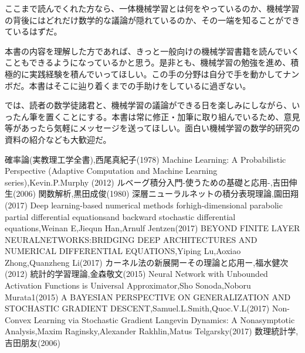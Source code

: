 \documentclass[dvipdfmx, a4paper]{jsarticle}
\begin{document}
ここまで読んでくれた方なら、一体機械学習とは何をやっているのか、機械学習の背後にはどれだけ数学的な議論が隠れているのか、その一端を知ることができているはずだ。

本書の内容を理解した方であれば、きっと一般向けの機械学習書籍を読んでいくこともできるようになっているかと思う。是非とも、機械学習の勉強を進め、積極的に実践経験を積んでいってほしい。この手の分野は自分で手を動かしてナンボだ。本書はそこに辿り着くまでの手助けをしているに過ぎない。

では、読者の数学徒諸君と、機械学習の議論ができる日を楽しみにしながら、いったん筆を置くことにする。本書は常に修正・加筆に取り組んでいるため、意見等があったら気軽にメッセージを送ってほしい。面白い機械学習の数学的研究の資料の紹介なども大歓迎だ。




\begin{thebibliography}{99}
   確率論(実教理工学全書),西尾真紀子(1978)
   Machine Learning: A Probabilistic Perspective (Adaptive Computation and Machine Learning series),Kevin.P.Murphy (2012)
   ルベーグ積分入門-使うための基礎と応用-,吉田伸生(2006)
   関数解析,黒田成俊(1980)
   深層ニューラルネットの積分表現理論,園田翔(2017)
   Deep learning-based numerical methods forhigh-dimensional parabolic partial differential equationsand backward stochastic differential equations,Weinan E,Jiequn Han,Arnulf Jentzen(2017)
   BEYOND FINITE LAYER NEURALNETWORKS:BRIDGING DEEP ARCHITECTURES AND NUMERICAL DIFFERENTIAL EQUATIONS,Yiping Lu,Aoxiao Zhong,Quanzheng Li(2017)
   カーネル法の新展開ーその理論と応用ー,福水健次(2012)
   統計的学習理論,金森敬文(2015)
   Neural Network with Unbounded Activation Functions is
Universal Approximator,Sho Sonoda,Noboru Murata1(2015)
   A BAYESIAN PERSPECTIVE ON GENERALIZATION AND
STOCHASTIC GRADIENT DESCENT,Samuel.L.Smith,Quoc.V.L(2017)
   Non-Convex Learning via Stochastic Gradient Langevin
Dynamics: A Nonasymptotic Analysis,Maxim Raginsky,Alexander Rakhlin,Matus Telgarsky(2017)
   数理統計学,吉田朋友(2006)
\end{thebibliography}
\end{document}
